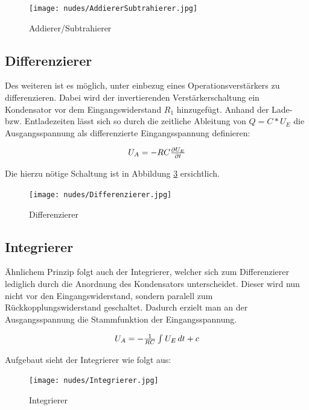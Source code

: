 \documentclass[12pt,a4paper,twoside]{article}
\begin{document}
\begin{figure}[H]
    \centering
    \texttt{[image: nudes/AddiererSubtrahierer.jpg]}
    \caption{Addierer/Subtrahierer \cite{teachcenter2}}
    \label{fig:AddiererSubtrahierer}
\end{figure}


\subsection{Differenzierer}

Des weiteren ist es möglich, unter einbezug eines Operationsverstärkers zu differenzieren. Dabei wird der invertierenden Verstärkerschaltung ein Kondensator vor dem Eingangswiderstand $R_{1}$ hinzugefügt. Anhand der Lade- bzw. Entladezeiten lässt sich so durch die zeitliche Ableitung von $Q = C*U_{E}$ die Ausgangsspannung als differenzierte Eingangsspannung definieren:

\begin{equation}
    \label{eq:DifferenziererAusgang}
    \centerline{$U_{A}=-RC \frac{\partial U_{E}}{\partial t}$}
\end{equation}

\noindent
Die hierzu nötige Schaltung ist in Abbildung \ref{fig:Integrierer} ersichtlich.

\begin{figure}[H]
    \centering
    \texttt{[image: nudes/Differenzierer.jpg]}
    \caption{Differenzierer \cite{teachcenter2}}
    \label{fig:Differenzierer}
\end{figure}


\subsection{Integrierer}

Ähnlichem Prinzip folgt auch der Integrierer, welcher sich zum Differenzierer lediglich durch die Anordnung des Kondensators unterscheidet. Dieser wird nun nicht vor den Eingangswiderstand, sondern paralell zum Rückkopplungswiderstand geschaltet.
Dadurch erzielt man an der Ausgangsspannung die Stammfunktion der Eingangsspannung.

\begin{equation}
    \label{eq:IntegriererAusgang}
    \centerline{$U_{A}=-\frac{1}{RC} \int_{}^{} U_{E} \,dt + c $}
\end{equation}

\noindent
Aufgebaut sieht der Integrierer wie folgt aus:

\begin{figure}[H]
    \centering
    \texttt{[image: nudes/Integrierer.jpg]}
    \caption{Integrierer \cite{teachcenter2}}
    \label{fig:Integrierer}
\end{figure}
\end{document}
